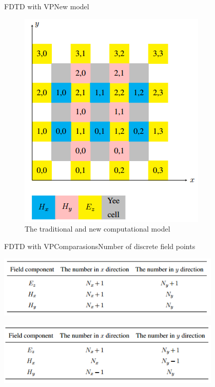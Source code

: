 \documentclass[11pt]{beamer}
\begin{document}
\begin{frame}{FDTD with VP}{New model}
\begin{figure}
\begin{minipage}{0.4\textwidth}
				\includegraphics[width=\textwidth]{new}
				\caption{The modified computational model}
			\end{minipage}
			\caption{The traditional and new computational model}
		\end{figure}
	\end{frame}
	
	\begin{frame}{FDTD with VP}{Comparasions}{Number of discrete field points}
		\begin{table}
			\includegraphics[width=0.8\textwidth]{oldnumber}
			\caption{The number of traditional scheme}
		\end{table}
		\begin{table}
			\includegraphics[width=0.8\textwidth]{newnumber}
			\caption{The number of modified scheme}
		\end{table}
	\end{frame}
	
\end{document}
